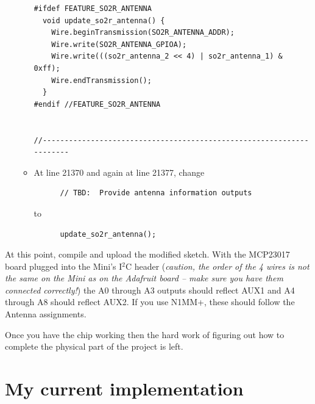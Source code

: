 \documentclass[12pt]{article}
\begin{document}
\begin{itemize}
\begin{itemize}
\begin{verbatim}
#ifdef FEATURE_SO2R_ANTENNA
  void update_so2r_antenna() {
    Wire.beginTransmission(SO2R_ANTENNA_ADDR);
    Wire.write(SO2R_ANTENNA_GPIOA);
    Wire.write(((so2r_antenna_2 << 4) | so2r_antenna_1) & 0xff);
    Wire.endTransmission();
  }
#endif //FEATURE_SO2R_ANTENNA


//---------------------------------------------------------------------
\end{verbatim}
\item
At line 21370 and again at line 21377, change
\begin{verbatim}
      // TBD:  Provide antenna information outputs
\end{verbatim}
to
\begin{verbatim}
      update_so2r_antenna();
\end{verbatim}
\end{itemize}
\end{itemize}

At this point, compile and upload the modified sketch. With the
MCP23017 board plugged into the Mini's I$^2$C header ({\em caution,
the order of the 4 wires is not the same on the Mini as on the
Adafruit board -- make sure you have them connected correctly!})
the A0 through A3 outputs should reflect AUX1 and A4 through A8 should
reflect AUX2. If you use N1MM+, these should follow the Antenna assignments.

Once you have the chip working then the hard work of figuring out how
to complete the physical part of the project is left.

\section{My current implementation}
\end{document}
